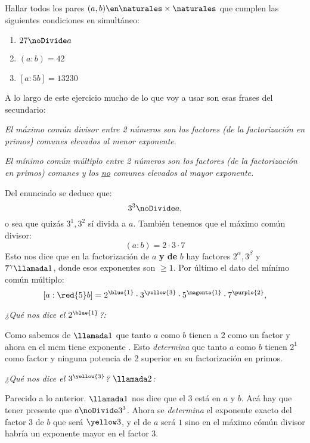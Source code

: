 \begin{enunciado}{\ejExtra}
  Hallar todos los pares $(a,b) \en \naturales \times \naturales$ que cumplen las siguientes condiciones en simultáneo:
  \begin{multicols}{3}
    \begin{enumerate}[label=]
      \item $27 \noDivide a$
      \item $(a:b) = 42$
      \item $[a:5b] = 13230$
    \end{enumerate}
  \end{multicols}
\end{enunciado}

A lo largo de este ejercicio mucho de lo que voy a usar son esas frases del secundario:

\begin{center}
  \textit{El máximo común divisor entre 2 números son los factores
    (de la factorización en primos) comunes elevados al menor exponente}.\par
  \textit{El mínimo común múltiplo entre 2 números son los factores
    (de la factorización en primos) comunes y los \underline{no} comunes elevados al mayor exponente.
  }
\end{center}

Del enunciado se deduce que:
$$
  3^3 \noDivide a,
$$
o sea que quizás $3^1,3^2$ sí divida a $a$. También tenemos que el máximo común divisor:
$$
  (a:b) = 2 \cdot 3 \cdot 7
$$
Esto nos dice que en la factorización de $a$ \textbf{y de} $b$ hay factores $2^\alpha, 3^\beta$ y $7^\gamma \llamada1$, donde esos exponentes son $\geq 1$.
Por último el dato del mínimo común múltiplo:
$$
  [a:\red{5}b] = 2^{\blue{1}} \cdot 3^{\yellow{3}} \cdot 5^{\magenta{1}} \cdot 7^{\purple{2}},
$$

\textit{¿Qué nos dice el $2^{\blue{1}}$?:}\par
Como sabemos de $\llamada1$ que tanto $a$ como $b$ tienen a 2 como un factor y ahora en el mcm tiene exponente . Esto
\textit{determina} que tanto $a$ como $b$ tienen $2^1$ como factor y ninguna potencia de 2 superior en su factorización en primos.

\bigskip

\textit{¿Qué nos dice el $3^{\yellow{3}}$? $\llamada2$:}\par
Parecido a lo anterior. $\llamada1$ nos dice que el 3 está en $a$ y $b$. Acá hay que tener presente que $a \noDivide 3^3$.
Ahora se \textit{determina} el exponente exacto del factor 3 de $b$ que será $\yellow3$, y el de $a$ será $1$ sino en el máximo cómún divisor
habría un exponente mayor en el factor 3.


